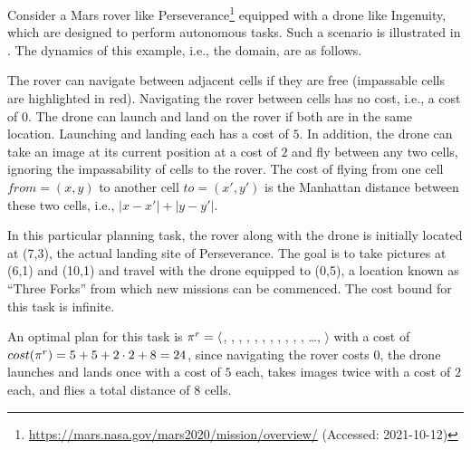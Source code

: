 \begin{example}\label{ex:rover}
  Consider a Mars rover like Perseverance\footnote{\label{note1}\url{https://mars.nasa.gov/mars2020/mission/overview/} (Accessed: 2021-10-12)} equipped with a drone like Ingenuity, which are designed to perform autonomous tasks. 
  Such a scenario is illustrated in . 
  The dynamics of this example, i.e., the domain, are as follows.

  The rover can navigate between adjacent cells if they are free (impassable cells are highlighted in red). Navigating the rover between cells has no cost, i.e., a cost of $0$. The drone can launch and land on the rover if both are in the same location. Launching and landing each has a cost of $5$. In addition, the drone can take an image at its current position at a cost of $2$ and fly between any two cells, ignoring the impassability of cells to the rover. The cost of flying from one cell $\textit{from} = (x,y)$ to another cell $\textit{to} = (x',y')$ is the Manhattan distance between these two cells, i.e., $|x-x'|+|y-y'|$.

  In this particular planning task, the rover along with the drone is initially located at (7,3), the actual landing site of Perseverance. The goal is to take pictures at (6,1) and (10,1) and travel with the drone equipped to (0,5), a location known as ``Three Forks'' from which new missions can be commenced.  The cost bound for this task is infinite.

  An optimal plan for this task is $\pi^r{} = \langle$,  , , , , , , , , , , \dots, $\rangle$ with a cost of $cost(\pi^r{}) = 5 + 5 + 2 \cdot 2 + 8 = 24$, since navigating the rover costs $0$, the drone launches and lands once with a cost of $5$ each, takes images twice with a cost of $2$ each, and flies a total distance of $8$ cells.



\end{example}

